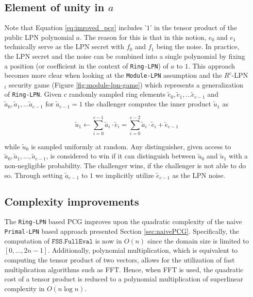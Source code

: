 \subsection{Element of unity in $a$}
Note that Equation \ref{eq:imroved_pcg} includes '$1$' in the tensor product of the public LPN polynomial $a$. The reason for this is that in this notion, $e_0$ and $e_1$ technically serve as the LPN secret with $f_0$ and $f_1$ being the noise. In practice, the LPN secret and the noise can be combined into a single polynomial by fixing a position (or coefficient in the context of \texttt{Ring-LPN}) of $a$ to $1$. This approach becomes more clear when looking at the \texttt{Module-LPN} assumption and the $R^{c}$-LPN$_{t}$ security game (Figure \ref{fig:module-lpn-game}) which represents a generalization of \texttt{Ring-LPN}. Given $c$ randomly sampled ring elements $\tilde{e}_0, \tilde{e}_1, ... \tilde{e}_{c-1}$ and $\tilde{a}_0, \tilde{a}_1, ...\tilde{a}_{c-1}$ for $\tilde{a}_{c-1}=1$  the challenger computes the inner product $\tilde{u}_1$ as

\begin{equation}
\label{eq:inner_product_with_a_1}
\tilde{u}_{1} \leftarrow \sum_{i=0}^{c-1} \tilde{a}_{i} \cdot \tilde{e}_{i} = \sum_{i=0}^{c-2} \tilde{a}_{i} \cdot \tilde{e}_{i} + \tilde{e}_{c-1}
\end{equation}

while $\tilde{u}_0$ is sampled uniformly at random. Any distinguisher, given access to $\tilde{a}_0, \tilde{a}_1, ..., \tilde{a}_{c-1}$, is considered to win if it can distinguish between $\tilde{u}_0$ and $\tilde{u}_1$ with a non-negligible probability. The challenger wins, if the challenger is not able to do so. Through setting $\tilde{a}_{c-1}$ to $1$ we implicitly utilize $\tilde{e}_{c-1}$ as the LPN noise.


\subsection{Complexity improvements}
The \texttt{Ring-LPN} based PCG improves upon the quadratic complexity of the naive \texttt{Primal-LPN} based approach presented Section \ref{sec:naivePCG}. Specifically, the computation of $\texttt{FSS.FullEval}$ is now in $O(n)$ since the domain size is limited to $[0, ..., 2n-1]$. Additionally, polynomial multiplication, which is equivalent to computing the tensor product of two vectors, allows for the utilization of fast multiplication algorithms such as FFT. Hence, when FFT is used, the quadratic cost of a tensor product is reduced to a polynomial multiplication of superlinear complexity in $O(n \log n)$.

